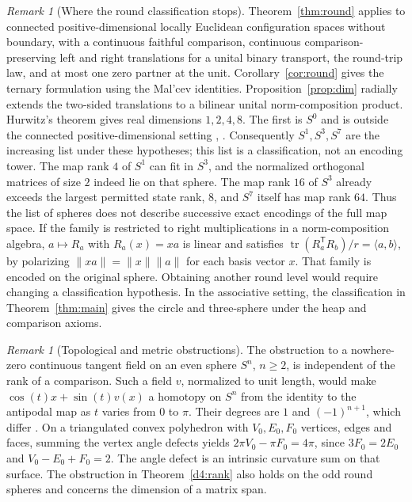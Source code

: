 \documentclass[11pt,reqno]{amsart}
\theoremstyle{definition}
\theoremstyle{remark}
\newtheorem{remark}[theorem]{Remark}
\numberwithin{equation}{section}
\begin{document}
\begin{remark}[Where the round classification stops]\label{d4:tower}
Theorem~\ref{thm:round} applies to connected positive-dimensional
locally Euclidean configuration spaces without boundary, with a continuous
faithful comparison, continuous comparison-preserving left and right
translations for a unital binary transport, the round-trip law, and at
most one zero partner at the unit. Corollary~\ref{cor:round} gives the
ternary formulation using the Mal'cev identities. Proposition~\ref{prop:dim}
radially extends the two-sided translations to a bilinear unital
norm-composition product. Hurwitz's theorem gives real dimensions
\(1,2,4,8\). The first is \(S^0\) and is outside the connected
positive-dimensional setting \cite{Hurwitz1898}, \cite[\S2.3]{Baez02}.
Consequently \(S^1,S^3,S^7\) are the increasing list under these hypotheses; this list is a classification, not an encoding tower.
The map rank \(4\) of \(S^1\) can fit in \(S^3\), and the normalized
orthogonal matrices of size \(2\) indeed lie on that sphere. The map
rank \(16\) of \(S^3\) already exceeds the largest permitted state rank,
\(8\), and \(S^7\) itself has map rank \(64\). Thus the list of spheres
does not describe successive exact encodings of the full map space.
If the family is restricted to right multiplications in a norm-composition
algebra, \(a\mapsto R_a\) with \(R_a(x)=xa\) is linear and satisfies
\(\operatorname{tr}(R_a^{\mathsf T}R_b)/r=\langle a,b\rangle\), by
polarizing \(\|xa\|=\|x\|\|a\|\) for each basis vector \(x\). That family
is encoded on the original sphere. Obtaining another round level would
require changing a classification hypothesis. In the associative setting,
the classification in Theorem~\ref{thm:main} gives the circle and three-sphere under
the heap and comparison axioms.
\end{remark}


\begin{remark}[Topological and metric obstructions]\label{d4:topology}
The obstruction to a nowhere-zero continuous tangent field on an even
sphere \(S^n\), \(n\ge2\), is independent of the rank of a comparison.
Such a field \(v\), normalized to unit length, would make
\(\cos(t)x+\sin(t)v(x)\) a homotopy on \(S^n\) from the identity to
the antipodal map as \(t\) varies from \(0\) to \(\pi\). Their degrees
are \(1\) and \((-1)^{n+1}\), which differ \cite[Sec.~2.2]{Hatcher}.
On a triangulated convex polyhedron with \(V_0,E_0,F_0\) vertices,
edges and faces, summing the vertex angle defects yields
\(2\pi V_0-\pi F_0=4\pi\), since \(3F_0=2E_0\) and
\(V_0-E_0+F_0=2\). The angle defect is an intrinsic curvature
sum on that surface. The obstruction in Theorem~\ref{d4:rank} also
holds on the odd round spheres and concerns the dimension of a
matrix span.
\end{remark}
\end{document}
